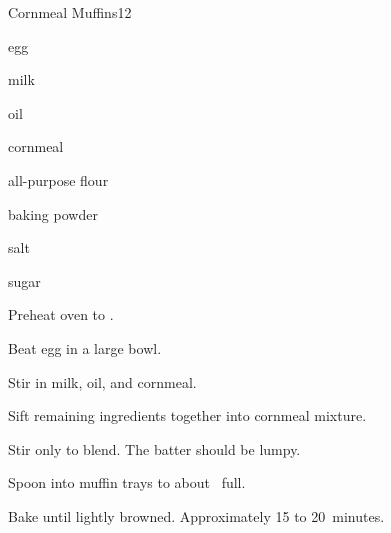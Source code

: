 \begin{recipe}{Cornmeal Muffins}{}{12}

\begin{ingredients}
\item egg
\item {} milk
\item {} oil
\item \C{\threequarter} cornmeal
\item \C{1\half} all-purpose flour
\item {} baking powder
\item \tp{\half} salt
\item {} sugar
\end{ingredients}

\begin{directions}
\item Preheat oven to .
\item Beat egg in a large bowl.
\item Stir in milk, oil, and cornmeal.
\item Sift remaining ingredients together into cornmeal mixture.
\item Stir only to blend. The batter should be lumpy.
\item Spoon into muffin trays to about \twothird~full.
\item Bake until lightly browned. Approximately 15 to 20~minutes.
\end{directions}

\end{recipe}
